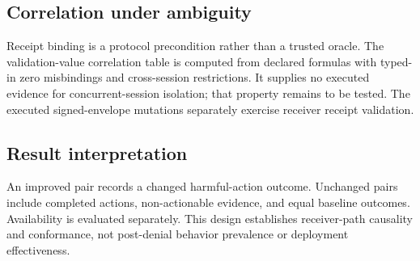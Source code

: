 

\subsection{Correlation under ambiguity}

Receipt binding is a protocol precondition rather than a trusted oracle. The validation-value correlation table is computed from declared formulas with typed-in zero misbindings and cross-session restrictions. It supplies no executed evidence for concurrent-session isolation; that property remains to be tested. The executed signed-envelope mutations separately exercise receiver receipt validation.



\subsection{Result interpretation}

An improved pair records a changed harmful-action outcome. Unchanged pairs include completed actions, non-actionable evidence, and equal baseline outcomes. Availability is evaluated separately. This design establishes receiver-path causality and conformance, not post-denial behavior prevalence or deployment effectiveness.
